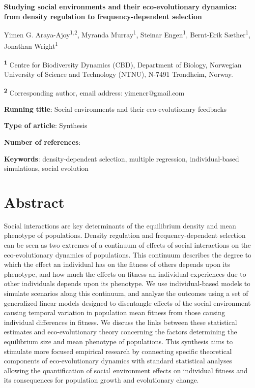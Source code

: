 \documentclass{article}
\begin{document}
	
	
	\begin{center}
		\large
		\textbf{Studying social environments and their eco-evolutionary dynamics: from density regulation to frequency-dependent selection}
	\end{center}
	
	\begin{center}
		Yimen G. Araya-Ajoy\textsuperscript{1,2}, Myranda Murray\textsuperscript{1}, Steinar Engen\textsuperscript{1}, Bernt-Erik Sæther\textsuperscript{1}, Jonathan Wright\textsuperscript{1}
	\end{center}
	
	\bigskip
	\noindent \textsuperscript{\textbf{1}} Centre for Biodiversity Dynamics (CBD), Department of Biology, Norwegian University of Science and Technology (NTNU), N-7491 Trondheim, Norway.
	
	\noindent \textsuperscript{\textbf{2}} Corresponding author, email address: yimencr@gmail.com
	
	\bigskip
	\noindent \textbf{Running title}: Social environments and their eco-evolutionary feedbacks  
	
	\bigskip
	\noindent \textbf{Type of article}: Synthesis
	
	\noindent \textbf{Number of references}: \ 
	
	\bigskip
	\noindent \textbf{Keywords}: density-dependent selection, multiple regression, individual-based simulations, social evolution
	
	
	\newpage
	\section{Abstract} 
	
	Social interactions are key determinants of the equilibrium density and mean phenotype of populations. Density regulation and frequency-dependent selection can be seen as two extremes of a continuum of effects of social interactions on the eco-evolutionary dynamics of populations. This continuum describes the degree to which the effect an individual has on the fitness of others depends upon its phenotype, and how much the effects on fitness an individual experiences due to other individuals depends upon its phenotype. We use individual-based models to simulate scenarios along this continuum, and analyze the outcomes using a set of generalized linear models designed to disentangle effects of the social environment causing temporal variation in population mean fitness from those causing individual differences in fitness. We discuss the links between these statistical estimates and eco-evolutionary theory concerning the factors determining the equilibrium size and mean phenotype of populations. This synthesis aims to stimulate more focused empirical research by connecting specific theoretical components of eco-evolutionary dynamics with standard statistical analyses allowing the quantification of social environment effects on individual fitness and its consequences for population growth and evolutionary change. 
	
\end{document}

